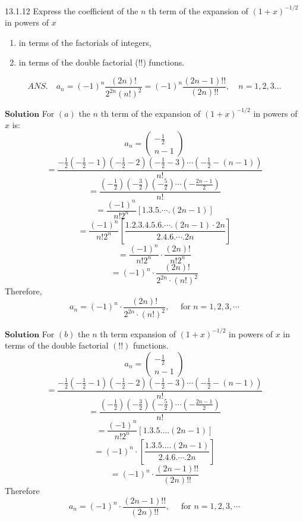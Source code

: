 \documentclass{article}
\begin{document}
\begin{flushleft}
\newpage

\begin{mybox}{13.1.12}
Express the coefficient of the $n$ th term of the expansion of $(1+x)^{-1 / 2}$ in powers of $x$
\begin{enumerate}[$(a)$]
\item in terms of the factorials of integers,
\item in terms of the double factorial
(!!) functions.
\end{enumerate}
$$
A N S . \quad a_{n}=(-1)^{n} \frac{(2 n) !}{2^{2 n}(n !)^{2}}=(-1)^{n} \frac{(2 n-1) ! !}{(2 n) ! !}, \quad n=1,2,3 \ldots
$$
\end{mybox}

$\boxed{\textbf{Solution}}$ For $(a)$ the $n$ th term of the expansion of $(1+x)^{-1 / 2}$ in powers of $x$ is:
$$
a_{n}=\left(\begin{array}{c}
-\frac{1}{2} \\
n-1
\end{array}\right)
$$
$$
=\frac{-\frac{1}{2}\left(-\frac{1}{2}-1\right)\left(-\frac{1}{2}-2\right)\left(-\frac{1}{2}-3\right) \cdots\left(-\frac{1}{2}-(n-1)\right)}{n !}
$$
$$
=\frac{\left(-\frac{1}{2}\right)\left(-\frac{3}{2}\right)\left(-\frac{5}{2}\right) \cdots\left(-\frac{2 n-1}{2}\right)}{n !}
$$
$$
=\frac{(-1)^{n}}{n ! 2^{n}}[1.3 .5 . \cdots .(2 n-1)]
$$
$$
=\frac{(-1)^{n}}{n ! 2^{n}}\left[\frac{1.2 .3 .4 .5 .6 . \cdots .(2 n-1) \cdot 2 n}{2.4 .6 . \cdots .2 n}\right]
$$
$$=\frac{(-1)^{n}}{n ! 2^{n}} \cdot \frac{(2 n) !}{n ! 2^{n}}$$
$$=(-1)^{n} \cdot \frac{(2 n) !}{2^{2 n} \cdot(n !)^{2}}$$
Therefore, 
$$
a_{n}=(-1)^{n} \cdot \frac{(2 n) !}{2^{2 n} \cdot(n !)^{2}}, \quad \text { for } n=1,2,3, \cdots
$$

$\boxed{\textbf{Solution}}$ For $(b)$ the $n$ th term expansion of $(1+x)^{-1 / 2}$ in powers of $x$ in terms of the double factorial $(!!)$ functions.
$$
a_{n}=\left(\begin{array}{c}
-\frac{1}{2} \\
n-1
\end{array}\right)
$$
$$
=\frac{-\frac{1}{2}\left(-\frac{1}{2}-1\right)\left(-\frac{1}{2}-2\right)\left(-\frac{1}{2}-3\right) \cdots\left(-\frac{1}{2}-(n-1)\right)}{n !}
$$
$$
=\frac{\left(-\frac{1}{2}\right)\left(-\frac{3}{2}\right)\left(-\frac{5}{2}\right) \cdots\left(-\frac{2 n-1}{2}\right)}{n !}
$$
$$=\frac{(-1)^{n}}{n ! 2^{n}}[1.3 .5 \ldots .(2 n-1)]$$
$$=(-1)^{n} \cdot\left[\frac{1.3 .5 \ldots .(2 n-1)}{2.4 .6 . \cdots .2 n}\right]$$
$$=(-1)^{n} \cdot \frac{(2 n-1) ! !}{(2 n) ! !}$$
Therefore
$$
a_{n}=(-1)^{n} \cdot \frac{(2 n-1) ! !}{(2 n) ! !}, \quad \text { for } n=1,2,3, \cdots
$$


\end{flushleft}
\end{document}
